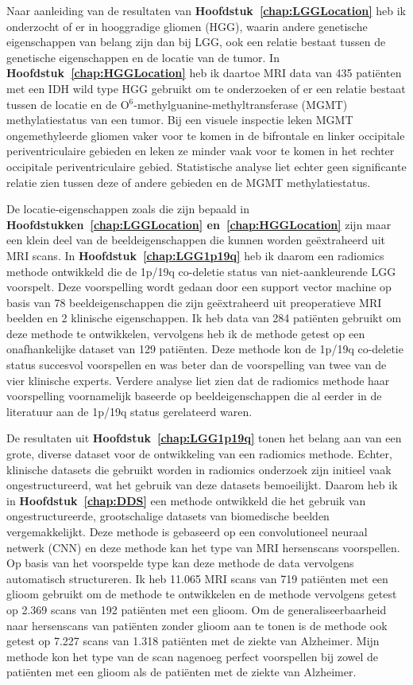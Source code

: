 Naar aanleiding van de resultaten van \textbf{Hoofdstuk~\ref{chap:LGGLocation}} heb ik onderzocht of er in hooggradige gliomen (HGG), waarin andere genetische eigenschappen van belang zijn dan bij LGG, ook een relatie bestaat tussen de genetische eigenschappen en de locatie van de tumor.
In \textbf{Hoofdstuk~\ref{chap:HGGLocation}} heb ik daartoe MRI data van 435 pati{\"e}nten met een IDH wild type HGG gebruikt om te onderzoeken of er een relatie bestaat tussen de locatie en de O$^6$-methylguanine-methyltransferase (MGMT) methylatiestatus van een tumor.
Bij een visuele inspectie leken  MGMT ongemethyleerde gliomen vaker voor te komen in de bifrontale en linker occipitale periventriculaire gebieden en leken ze minder vaak voor te komen in het rechter occipitale periventriculaire gebied.
Statistische analyse liet echter geen significante relatie zien tussen deze of andere gebieden en de MGMT methylatiestatus.

De locatie-eigenschappen zoals die zijn bepaald in \textbf{Hoofdstukken~\ref{chap:LGGLocation} en~\ref{chap:HGGLocation}} zijn maar een klein deel van de beeldeigenschappen die kunnen worden ge{\"e}xtraheerd uit MRI scans.
In \textbf{Hoofdstuk~\ref{chap:LGG1p19q}} heb ik daarom een radiomics methode ontwikkeld die de 1p/19q co-deletie status van niet-aankleurende LGG voorspelt.
Deze voorspelling wordt gedaan door een support vector machine op basis van 78 beeldeigenschappen die zijn ge{\"e}xtraheerd uit preoperatieve MRI beelden en 2 klinische eigenschappen.
Ik heb data van 284 pati{\"e}nten gebruikt om deze methode te ontwikkelen, vervolgens heb ik de methode getest op een onafhankelijke dataset van 129 pati{\"e}nten.
Deze methode kon de 1p/19q co-deletie status succesvol voorspellen en was beter dan de voorspelling van twee van de vier klinische experts.
Verdere analyse liet zien dat de radiomics methode haar voorspelling voornamelijk baseerde op beeldeigenschappen die al eerder in de literatuur aan de 1p/19q status gerelateerd waren.

De resultaten uit \textbf{Hoofdstuk~\ref{chap:LGG1p19q}} tonen het belang aan van een grote, diverse dataset voor de ontwikkeling van een radiomics methode.
Echter, klinische datasets die gebruikt worden in radiomics onderzoek zijn initieel vaak ongestructureerd, wat het gebruik van deze datasets bemoeilijkt.
Daarom heb ik in \textbf{Hoofdstuk~\ref{chap:DDS}} een methode ontwikkeld die het gebruik van ongestructureerde, grootschalige datasets van biomedische beelden vergemakkelijkt.
Deze methode is gebaseerd op een convolutioneel neuraal netwerk (CNN) en deze methode kan het type van  MRI hersenscans voorspellen.
Op basis van het voorspelde type kan deze methode de data vervolgens automatisch structureren.
Ik heb 11.065 MRI scans van 719 pati{\"e}nten met een glioom gebruikt om de methode te ontwikkelen en de methode vervolgens getest op 2.369 scans van 192 pati{\"e}nten met een glioom.
Om de generaliseerbaarheid naar hersenscans van pati{\"e}nten zonder glioom aan te tonen is de methode ook getest op 7.227 scans van 1.318 pati{\"e}nten met de ziekte van Alzheimer.
Mijn methode kon het type van de scan nagenoeg perfect voorspellen bij zowel de pati{\"e}nten met een glioom als de pati{\"e}nten met de ziekte van Alzheimer.

